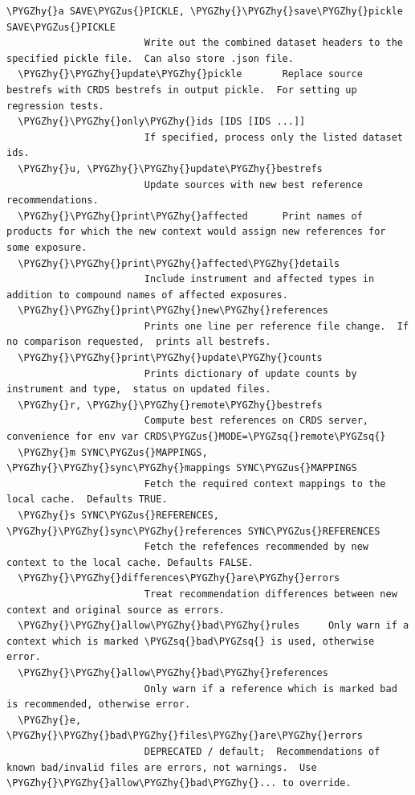 \documentclass[letterpaper,10pt,english]{sphinxmanual}
\def\PYGZus{\char`\_}
\def\PYGZhy{\char`\-}
\def\PYGZsq{\char`\'}
\begin{document}
\begin{Verbatim}[commandchars=\\\{\}]
  \PYGZhy{}a SAVE\PYGZus{}PICKLE, \PYGZhy{}\PYGZhy{}save\PYGZhy{}pickle SAVE\PYGZus{}PICKLE
                        Write out the combined dataset headers to the specified pickle file.  Can also store .json file.
  \PYGZhy{}\PYGZhy{}update\PYGZhy{}pickle       Replace source bestrefs with CRDS bestrefs in output pickle.  For setting up regression tests.
  \PYGZhy{}\PYGZhy{}only\PYGZhy{}ids [IDS [IDS ...]]
                        If specified, process only the listed dataset ids.
  \PYGZhy{}u, \PYGZhy{}\PYGZhy{}update\PYGZhy{}bestrefs
                        Update sources with new best reference recommendations.
  \PYGZhy{}\PYGZhy{}print\PYGZhy{}affected      Print names of products for which the new context would assign new references for some exposure.
  \PYGZhy{}\PYGZhy{}print\PYGZhy{}affected\PYGZhy{}details
                        Include instrument and affected types in addition to compound names of affected exposures.
  \PYGZhy{}\PYGZhy{}print\PYGZhy{}new\PYGZhy{}references
                        Prints one line per reference file change.  If no comparison requested,  prints all bestrefs.
  \PYGZhy{}\PYGZhy{}print\PYGZhy{}update\PYGZhy{}counts
                        Prints dictionary of update counts by instrument and type,  status on updated files.
  \PYGZhy{}r, \PYGZhy{}\PYGZhy{}remote\PYGZhy{}bestrefs
                        Compute best references on CRDS server,  convenience for env var CRDS\PYGZus{}MODE=\PYGZsq{}remote\PYGZsq{}
  \PYGZhy{}m SYNC\PYGZus{}MAPPINGS, \PYGZhy{}\PYGZhy{}sync\PYGZhy{}mappings SYNC\PYGZus{}MAPPINGS
                        Fetch the required context mappings to the local cache.  Defaults TRUE.
  \PYGZhy{}s SYNC\PYGZus{}REFERENCES, \PYGZhy{}\PYGZhy{}sync\PYGZhy{}references SYNC\PYGZus{}REFERENCES
                        Fetch the refefences recommended by new context to the local cache. Defaults FALSE.
  \PYGZhy{}\PYGZhy{}differences\PYGZhy{}are\PYGZhy{}errors
                        Treat recommendation differences between new context and original source as errors.
  \PYGZhy{}\PYGZhy{}allow\PYGZhy{}bad\PYGZhy{}rules     Only warn if a context which is marked \PYGZsq{}bad\PYGZsq{} is used, otherwise error.
  \PYGZhy{}\PYGZhy{}allow\PYGZhy{}bad\PYGZhy{}references
                        Only warn if a reference which is marked bad is recommended, otherwise error.
  \PYGZhy{}e, \PYGZhy{}\PYGZhy{}bad\PYGZhy{}files\PYGZhy{}are\PYGZhy{}errors
                        DEPRECATED / default;  Recommendations of known bad/invalid files are errors, not warnings.  Use \PYGZhy{}\PYGZhy{}allow\PYGZhy{}bad\PYGZhy{}... to override.

\end{Verbatim}
\end{document}
